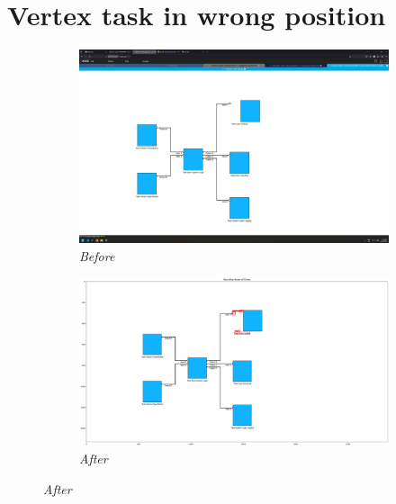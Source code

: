 \documentclass{article}
\begin{document}
\section{Vertex task in wrong position}
\begin{figure}[H]
    \centering
    \begin{subfigure}[t]{0.9\textwidth}
        \centering
        \includegraphics[width=\textwidth]{testcases/vertex_task_wrong_position/134530-573593_input_image.png}
        \caption*{\textit{Before}}
    \end{subfigure}
    \newline
    \begin{subfigure}[t]{0.9\textwidth}
        \centering
        \includegraphics[width=\textwidth]{testcases/vertex_task_wrong_position/134550-162424_element_bbox_errors_labeled_colored.png}
        \caption*{\textit{After}}
    \end{subfigure}
    \label{fig:vertex_task_wrong_position}
\end{figure}
\newpage
\end{document}

